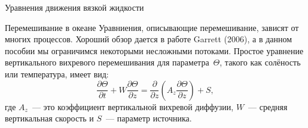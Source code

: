 \begin{chapter}{Уравнения движения вязкой жидкости}
\begin{section}{Перемешивание в океане}
Уравниения, описывающие перемешивание, зависят от многих процессов.
Хороший обзор дается в работе Garrett (2006), а в данном пособии мы
ограничимся некоторыми несложными потоками. Простое уравнение вертикального
вихревого перемешивания для параметра~$\Theta$, такого как солёность или
температура, имеет вид:
\begin{equation}\label{eq:8.21}
\frac{\partial \Theta}{\partial t} + W \frac{\partial \Theta}{\partial z}
 = \frac{\partial}{\partial z} \left(A_z\frac{\partial \Theta}{\partial z}\right) + S,
\end{equation}
где $A_z$~--- это коэффициент вертикальной вихревой диффузии,
$W$~--- средняя вертикальная скорость и $S$~--- параметр источника.
%


\end{section}
\end{chapter}
